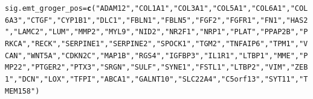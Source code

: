 \documentclass{article}\usepackage[]{graphicx}\usepackage[]{color}
\makeatletter
\newcommand{\hlstr}[1]{\textcolor[rgb]{0.192,0.494,0.8}{#1}}%
\newcommand{\hlstd}[1]{\textcolor[rgb]{0.345,0.345,0.345}{#1}}%
\newcommand{\hlkwb}[1]{\textcolor[rgb]{0.69,0.353,0.396}{#1}}%
\newcommand{\hlkwd}[1]{\textcolor[rgb]{0.737,0.353,0.396}{\textbf{#1}}}%
\newenvironment{kframe}{%
 \def\at@end@of@kframe{}%
 \ifinner\ifhmode%
  \def\at@end@of@kframe{\end{minipage}}%
  \begin{minipage}{\columnwidth}%
 \fi\fi%
 \def\FrameCommand##1{\hskip\@totalleftmargin \hskip-\fboxsep
 \colorbox{shadecolor}{##1}\hskip-\fboxsep
     \hskip-\linewidth \hskip-\@totalleftmargin \hskip\columnwidth}%
 \MakeFramed {\advance\hsize-\width
   \@totalleftmargin\z@ \linewidth\hsize
   \@setminipage}}%
 {\par\unskip\endMakeFramed%
 \at@end@of@kframe}
\newenvironment{knitrout}{}{} %
\makeatother
\begin{document}
\begin{knitrout}
\color{fgcolor}\begin{kframe}
\begin{alltt}
\hlstd{sig.emt_groger_pos} \hlkwb{=} \hlkwd{c}\hlstd{(}\hlstr{"ADAM12"}\hlstd{,} \hlstr{"COL1A1"}\hlstd{,} \hlstr{"COL3A1"}\hlstd{,} \hlstr{"COL5A1"}\hlstd{,} \hlstr{"COL6A1"}\hlstd{,} \hlstr{"COL6A3"}\hlstd{,} \hlstr{"CTGF"}\hlstd{,} \hlstr{"CYP1B1"}\hlstd{,} \hlstr{"DLC1"}\hlstd{,} \hlstr{"FBLN1"}\hlstd{,} \hlstr{"FBLN5"}\hlstd{,} \hlstr{"FGF2"}\hlstd{,} \hlstr{"FGFR1"}\hlstd{,} \hlstr{"FN1"}\hlstd{,} \hlstr{"HAS2"}\hlstd{,} \hlstr{"LAMC2"}\hlstd{,} \hlstr{"LUM"}\hlstd{,} \hlstr{"MMP2"}\hlstd{,} \hlstr{"MYL9"}\hlstd{,} \hlstr{"NID2"}\hlstd{,} \hlstr{"NR2F1"}\hlstd{,} \hlstr{"NRP1"}\hlstd{,} \hlstr{"PLAT"}\hlstd{,} \hlstr{"PPAP2B"}\hlstd{,} \hlstr{"PRKCA"}\hlstd{,} \hlstr{"RECK"}\hlstd{,} \hlstr{"SERPINE1"}\hlstd{,} \hlstr{"SERPINE2"}\hlstd{,} \hlstr{"SPOCK1"}\hlstd{,} \hlstr{"TGM2"}\hlstd{,} \hlstr{"TNFAIP6"}\hlstd{,} \hlstr{"TPM1"}\hlstd{,} \hlstr{"VCAN"}\hlstd{,} \hlstr{"WNT5A"}\hlstd{,} \hlstr{"CDKN2C"}\hlstd{,} \hlstr{"MAP1B"}\hlstd{,} \hlstr{"RGS4"}\hlstd{,} \hlstr{"IGFBP3"}\hlstd{,} \hlstr{"IL1R1"}\hlstd{,} \hlstr{"LTBP1"}\hlstd{,} \hlstr{"MME"}\hlstd{,} \hlstr{"PMP22"}\hlstd{,} \hlstr{"PTGER2"}\hlstd{,} \hlstr{"PTX3"}\hlstd{,} \hlstr{"SRGN"}\hlstd{,} \hlstr{"SULF"}\hlstd{,} \hlstr{"SYNE1"}\hlstd{,} \hlstr{"FSTL1"}\hlstd{,} \hlstr{"LTBP2"}\hlstd{,} \hlstr{"VIM"}\hlstd{,} \hlstr{"ZEB1"}\hlstd{,} \hlstr{"DCN"}\hlstd{,} \hlstr{"LOX"}\hlstd{,} \hlstr{"TFPI"}\hlstd{,} \hlstr{"ABCA1"}\hlstd{,} \hlstr{"GALNT10"}\hlstd{,} \hlstr{"SLC22A4"}\hlstd{,} \hlstr{"C5orf13"}\hlstd{,} \hlstr{"SYT11"}\hlstd{,} \hlstr{"TMEM158"}\hlstd{)}

\end{alltt}
\end{kframe}
\end{knitrout}
\end{document}
